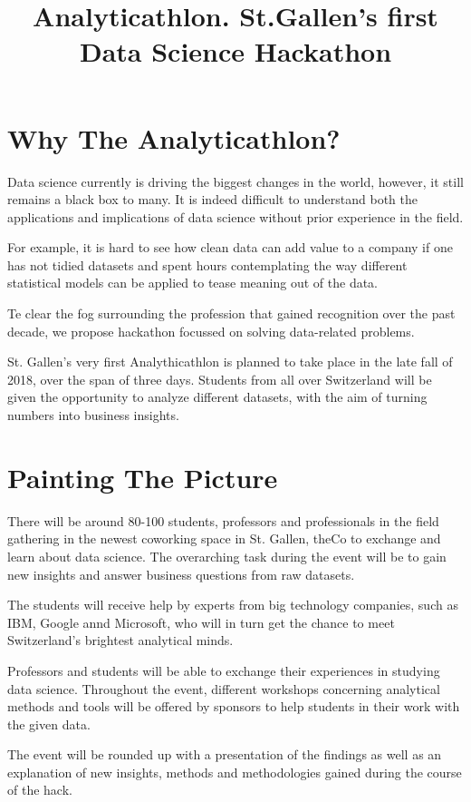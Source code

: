 \documentclass[11pt,a4paper,notitlepage]{article}
\title{Analyticathlon. St.Gallen's first Data Science Hackathon}
\date{\vspace{-5ex}}
\author{\vspace{-5ex}}
\begin{document}
\maketitle
\thispagestyle{fancy}

\section*{Why The Analyticathlon?}
 Data science currently is driving the biggest changes in the world, however, it still remains a black box to many. It is indeed difficult to understand both the applications and implications of data science without prior experience in the field.
 
 For example, it is hard to see how clean data can add value to a company if one has not tidied datasets and spent hours contemplating the way different statistical models can be applied to tease meaning out of the data.
 
 Te clear the fog surrounding the profession that gained recognition over the past decade, we propose hackathon focussed on solving data-related problems.
 
 St. Gallen's very first Analythicathlon is planned to take place in the late fall of 2018, over the span of three days. Students from all over Switzerland will be given the opportunity to analyze different datasets, with the aim of turning numbers into business insights.
 
\section*{Painting The Picture}
There will be around 80-100 students, professors and professionals in the field gathering in the newest coworking space in St. Gallen, theCo to exchange and learn about data science. The overarching task during the event will be to gain new insights and answer business questions from raw datasets. 

The students will receive help by experts from big technology companies, such as IBM, Google annd Microsoft, who will in turn get the chance to meet Switzerland's brightest analytical minds. 

Professors and students will be able to exchange their experiences in studying data science. Throughout the event, different workshops concerning analytical methods and tools will be offered by sponsors to help students in their work with the given data.

The event will be rounded up with a presentation of the findings as well as an explanation of new insights, methods and methodologies gained during the course of the hack.
\end{document}
